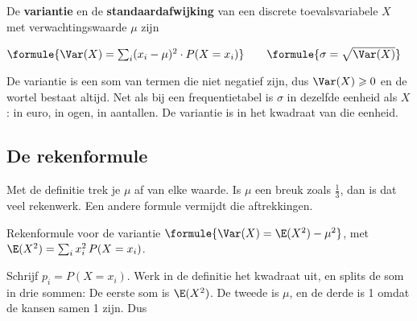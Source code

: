 \begin{theorie}
De \textbf{\textcolor{accent}{variantie}} en de \textbf{\textcolor{accent}{standaardafwijking}} van een discrete toevalsvariabele $X$ met verwachtingswaarde $\mu$ zijn

\vspace{1mm}
\qquad $\formule{\Var(X) = \sum_{i} (x_i - \mu)^2 \cdot P(X = x_i)} \qquad \formule{\sigma = \sqrt{\Var(X)}}$
\end{theorie}

De variantie is een som van termen die niet negatief zijn, dus $\Var(X) \geqslant 0$ en de wortel bestaat altijd. Net als bij een frequentietabel is $\sigma$ in dezelfde eenheid als $X$: in euro, in ogen, in aantallen. De variantie is in het kwadraat van die eenheid.


\begin{oefeningen}
\end{oefeningen}

\subsection{De rekenformule}

Met de definitie trek je $\mu$ af van elke waarde. Is $\mu$ een breuk zoals $\frac13$, dan is dat veel rekenwerk. Een andere formule vermijdt die aftrekkingen.

\begin{theorie}
\begin{stelling}{Rekenformule voor de variantie}
\qquad $\formule{\Var(X) = \E(X^2) - \mu^2}$, \quad met $\E(X^2) = \sum_i x_i^2 \, P(X = x_i)$.
\end{stelling}

\begin{bewijs}
Schrijf $p_i = P(X = x_i)$. Werk in de definitie het kwadraat uit, en splits de som in drie sommen:
De eerste som is $\E(X^2)$. De tweede is $\mu$, en de derde is 1 omdat de kansen samen 1 zijn. Dus
\end{bewijs}
\end{theorie}

